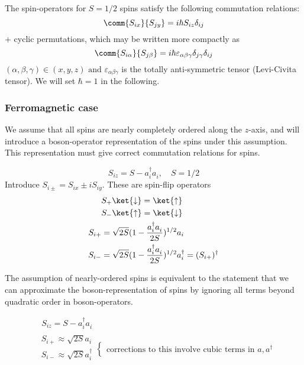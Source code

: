 The spin-operators for $S = 1/2$ spins satisfy the following commutation relations:
\begin{equation}
    \comm{S_{ix}}{S_{jy}} = i\hbar S_{iz}\delta_{ij}
\end{equation}
+ cyclic permutations, which may be written more compactly as
\begin{equation}
    \comm{S_{i\alpha}}{S_{j\beta}} = i\hbar \varepsilon_{\alpha\beta\gamma} \delta_{j\gamma} \delta_{ij} \\
\end{equation}
$(\alpha, \beta, \gamma) \in (x, y, z)  \text{ and } \varepsilon_{\alpha\beta\gamma}$ is the totally anti-symmetric tensor (Levi-Civita tensor). We will set $\hbar = 1$ in the following. \\

\subsubsection{Ferromagnetic case}
We assume that all spins are nearly completely ordered along the $z$-axis, and will introduce a boson-operator representation of the spins under this assumption. This representation must give correct commutation relations for spins.

\begin{equation}
    S_{iz} = S - a_i^\dagger a_i^{}, \quad S = 1/2
\end{equation}
Introduce $S_{i\pm} = S_{ix} \pm iS_{iy}$. These are spin-flip operators
\begin{align}
    &S_+ \ket{\downarrow} = \ket{\uparrow} \\
    &S_- \ket{\uparrow} = \ket{\downarrow} \\
    S_{i+} &= \sqrt{2S}(1-\frac{a_i^\dagger a_i^{}}{2S})^{1/2}a_i \\
    S_{i-} &= \sqrt{2S}(1-\frac{a_i^\dagger a_i^{}}{2S})^{1/2}a_i^\dagger = (S_{i+})^\dagger
\end{align}

The assumption of nearly-ordered spins is equivalent to the statement that we can approximate the boson-representation of spins by ignoring all terms beyond quadratic order in boson-operators.

\begin{align}
& \ \ S_{iz} = S - a_i^\dagger a_i^{} \\
&\begin{array}{c}
S_{i+} \approx \sqrt{2S}a_i \\
S_{i-} \approx \sqrt{2S}a_i^\dagger \\
\end{array}
\begin{cases}
\text{corrections to this involve cubic terms in } a, a^\dagger 
\end{cases}
\end{align}

